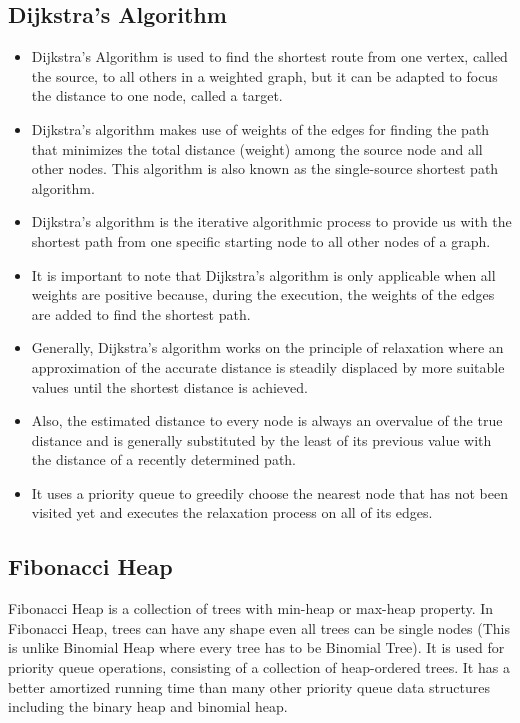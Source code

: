 \documentclass{article}
\begin{document}
\subsection{Dijkstra’s Algorithm }
\begin{itemize}
\item Dijkstra's Algorithm is used to find the shortest route from one vertex, called the source, to all others in a weighted graph, but it can be adapted to focus the distance to one node, called a target.
\item Dijkstra's algorithm makes use of weights of the edges for finding the path that minimizes the total distance (weight) among the source node and all other nodes. This algorithm is also known as the single-source shortest path algorithm.
\item Dijkstra’s algorithm is the iterative algorithmic process to provide us with the shortest path from one specific starting node to all other nodes of a graph.
\item It is important to note that Dijkstra’s algorithm is only applicable when all weights are positive because, during the execution, the weights of the edges are added to find the shortest path.
\item Generally, Dijkstra’s algorithm works on the principle of relaxation where an approximation of the accurate distance is steadily displaced by more suitable values until the shortest distance is achieved.
\item Also, the estimated distance to every node is always an overvalue of the true distance and is generally substituted by the least of its previous value with the distance of a recently determined path. 
\item It uses a priority queue to greedily choose the nearest node that has not been visited yet and executes the relaxation process on all of its edges.
\end{itemize}

\subsection{Fibonacci Heap}
Fibonacci Heap is a collection of trees with min-heap or max-heap property. In Fibonacci Heap, trees can have any shape even all trees can be single nodes (This is unlike Binomial Heap where every tree has to be Binomial Tree). It is used for priority queue operations, consisting of a collection of heap-ordered trees. It has a better amortized running time than many other priority queue data structures including the binary heap and binomial heap.
\end{document}
